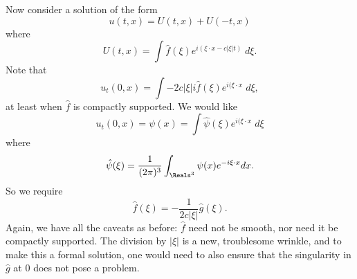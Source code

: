 \documentclass[minion]{homework}
\begin{document}
\begin{aproblems}
\subsol

Now consider a solution of the form
\[
u(t,x) = U(t,x)+U(-t,x)
\]
where
\[
U(t,x) = \int \hat f(\xi) e^{i(\xi\cdot x - c|\xi|t)} \; d\xi.
\]
Note that
\[
u_t(0,x) = \int -2c|\xi|i \hat f(\xi) e^{i(\xi\cdot x} \; d\xi,
\]
at least when $\hat f$  is compactly supported.  
We would like
\[
u_t(0,x) = \psi(x) = \int \hat \psi (\xi) e^{i(\xi\cdot x} \; d\xi
\]
where
\[
\hat \psi(\xi) = \frac{1}{(2\pi)^3} \int_{\Reals^3} \psi(x) e^{-i\xi\cdot x } dx.
\]
So we require
\[
\hat f(\xi) = -\frac{1}{2c|\xi|} \hat g(\xi).
\]
Again, we have all the caveats as before: $\hat f$ need not be smooth, nor need it be compactly
supported.  The division by $|\xi|$ is a new, troublesome wrinkle, and to make this a formal 
solution, one would need to also ensure that the singularity in $\hat g$ at $0$ does not
pose a problem.

\end{aproblems}
\end{document}
